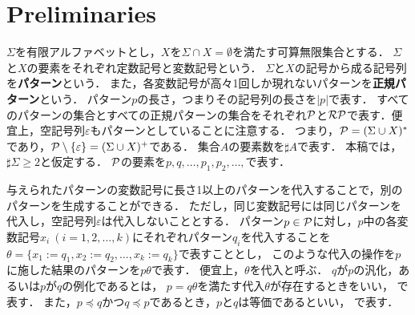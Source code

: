 \section{Preliminaries}


$\Sigma$を有限アルファベットとし，$X$を$\Sigma \cap X=\emptyset$を満たす可算無限集合とする．
$\Sigma$と$X$の要素をそれぞれ定数記号と変数記号という．
$\Sigma$と$X$の記号から成る記号列を\textbf{パターン}という．
また，各変数記号が高々1回しか現れないパターンを\textbf{正規パターン}という．
パターン$p$の長さ，つまりその記号列の長さを$|p|$で表す．
すべてのパターンの集合とすべての正規パターンの集合をそれぞれ$\mathcal{P}$と$\mathcal{RP}$で表す．便宜上，空記号列$\varepsilon$もパターンとしていることに注意する．
つまり，$\mathcal{P}=(\Sigma \cup X)^{*}$であり，$\mathcal{P}\setminus\{\varepsilon\}=(\Sigma \cup X)^{+}$である．
集合$A$の要素数を$\sharp A$で表す．
本稿では，$\sharp \Sigma \geq 2$と仮定する．
$\mathcal{P}$の要素を$p,q,\ldots,p_1,p_2,\ldots,$で表す．



与えられたパターンの変数記号に長さ1以上のパターンを代入することで，別のパターンを生成することができる．
ただし，同じ変数記号には同じパターンを代入し，空記号列$\varepsilon$は代入しないこととする．
パターン$p \in \mathcal{P}$に対し，$p$中の各変数記号$x_i~(i=1,2,\ldots,k)$にそれぞれパターン$q_i$を代入することを$\theta=\{x_1:=q_1,x_2:=q_2,\ldots,x_k:=q_k\}$で表すこととし，
このような代入の操作を$p$に施した結果のパターンを$p\theta$で表す．
便宜上，$\theta$を代入と呼ぶ．
$q$が$p$の汎化，あるいは$p$が$q$の例化であるとは，
$p=q \theta$を満たす代入$\theta$が存在するときをいい，
で表す．
また，$p \preceq q$かつ$q \preceq p$であるとき，$p$と$q$は等価であるといい， で表す．

